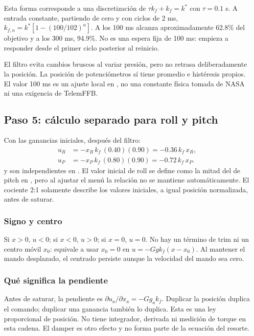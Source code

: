 Esta forma corresponde a una discretización de $\tau\dot{k}_f+k_f=k^*$ con $\tau=0.1$ s. A entrada constante, partiendo de cero y con ciclos de 2 ms, $k_{f,n}=k^*[1-(100/102)^n]$. A los 100 ms alcanza aproximadamente 62.8\% del objetivo y a los 300 ms, 94.9\%. No es una espera fija de 100 ms: empieza a responder desde el primer ciclo posterior al reinicio.

El filtro evita cambios bruscos al variar presión, pero no retrasa deliberadamente la posición. La posición de potenciómetros sí tiene promedio e histéresis propios. El valor 100 ms es un ajuste local en , no una constante física tomada de NASA ni una exigencia de TelemFFB.

\subsection{Paso 5: cálculo separado para roll y pitch}
Con las ganancias iniciales, después del filtro:
\begin{align}
u_R&=-x_R\,k_f\,(0.40)(0.90)=-0.36\,k_f\,x_R,\\
u_P&=-x_P\,k_f\,(0.80)(0.90)=-0.72\,k_f\,x_P.
\end{align}
 y  son independientes en . El valor inicial de roll se define como la mitad del de pitch en , pero al ajustar el menú la relación no se mantiene automáticamente. El cociente 2:1 solamente describe los valores iniciales, a igual posición normalizada, antes de saturar.

\subsubsection{Signo y centro}
Si $x>0$, $u<0$; si $x<0$, $u>0$; si $x=0$, $u=0$. No hay un término de trim ni un centro móvil $x_0$: equivale a usar $x_0=0$ en $u=-Ggk_f(x-x_0)$. Al mantener el mando desplazado, el centrado persiste aunque la velocidad del mando sea cero.

\subsubsection{Qué significa la pendiente}
Antes de saturar, la pendiente es $\partial u_a/\partial x_a=-Gg_ak_f$. Duplicar la posición duplica el comando; duplicar una ganancia también lo duplica. Esta es una ley proporcional de posición. No tiene integrador, derivada ni medición de torque en esta cadena. El damper es otro efecto y no forma parte de la ecuación del resorte.

